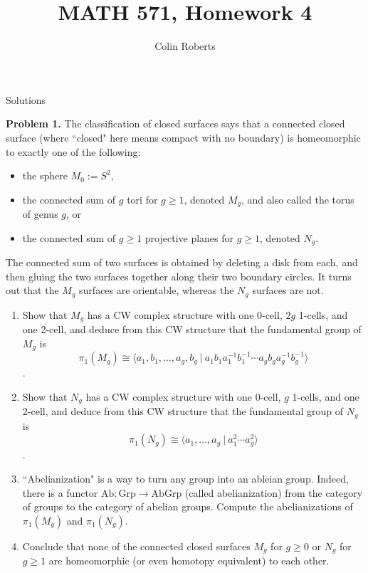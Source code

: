 \documentclass[leqno]{article}
\author{Colin Roberts}
\title{MATH 571, Homework 4}
\theoremstyle{nonumberplain}
\begin{document}
\maketitle
\begin{large}
\begin{center}
Solutions
\end{center}
\end{large}


\noindent\textbf{Problem 1.} 
The classification of closed surfaces says that a connected closed surface (where ``closed" here means compact with no boundary) is homeomorphic to exactly one of the following:
\begin{itemize}
\item the sphere $M_0:=S^2$, 
\item the connected sum of $g$ tori for $g\ge1$, denoted $M_g$, and also called the torus of genus $g$, or
\item the connected sum of $g\ge 1$ projective planes for $g\ge 1$, denoted $N_g$.
\end{itemize}
The connected sum of two surfaces is obtained by deleting a disk from each, and then gluing the two surfaces together along their two boundary circles. It turns out that the $M_g$ surfaces are orientable, whereas the $N_g$ surfaces are not.
\begin{enumerate}
\item Show that $M_g$ has a CW complex structure with one 0-cell, $2g$ 1-cells, and one 2-cell, and deduce from this CW structure that the fundamental group of $M_g$ is \[\pi_1(M_g)\cong\langle a_1,b_1,\ldots,a_g,b_g~|~a_1b_1a_1^{-1}b_1^{-1}\cdots a_gb_ga_g^{-1}b_g^{-1}\rangle\]. 
\item Show that $N_g$ has a CW complex structure with one 0-cell, $g$ 1-cells, and one 2-cell, and deduce from this CW structure that the fundamental group of $N_g$ is \[\pi_1(N_g)\cong\langle a_1,\ldots,a_g~|~a_1^2\cdots a_g^2\rangle\].
\item ``Abelianization" is a way to turn any group into an ableian group. Indeed, there is a functor $\mathrm{Ab}\colon \mathrm{Grp}\to\mathrm{AbGrp}$ (called abelianization)  from the category of groups to the category of abelian groups. Compute the abelianizations of $\pi_1(M_g)$ and $\pi_1(N_g)$.
\item Conclude that none of the connected closed surfaces $M_g$ for $g\ge0$ or $N_g$ for $g\ge1$ are homeomorphic (or even homotopy equivalent) to each other. 
\end{enumerate}
\end{document}

